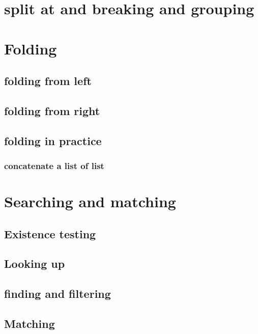 \documentclass{article}
\begin{document}
\section{split at and breaking and grouping}

\section{Folding}

\subsection{folding from left}

\subsection{folding from right}

\subsection{folding in practice}

\subsubsection{concatenate a list of list}

\section{Searching and matching}

\subsection{Existence testing}

\subsection{Looking up}

\subsection{finding and filtering}



\subsection{Matching}
\end{document}
